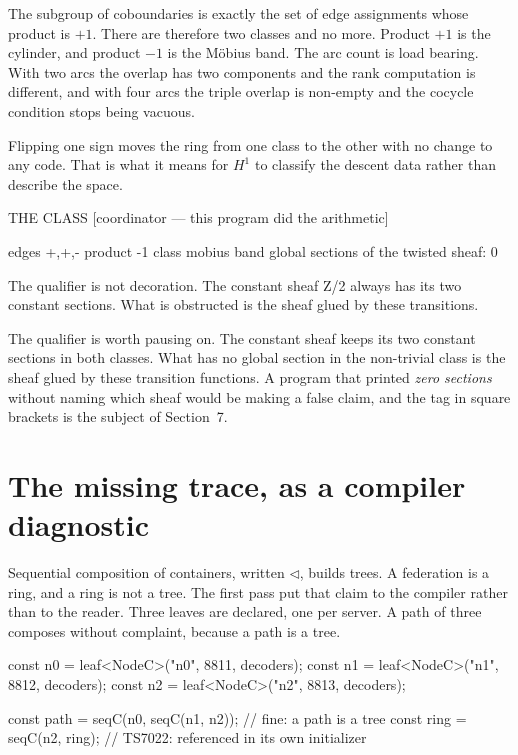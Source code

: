 \documentclass[11pt,a4paper]{article}
\begin{document}
The subgroup of coboundaries is exactly the set of edge assignments whose product is
$+1$. There are therefore two classes and no more. Product $+1$ is the cylinder, and
product $-1$ is the M\"obius band. The arc count is load bearing. With two arcs the
overlap has two components and the rank computation is different, and with four arcs
the triple overlap is non-empty and the cocycle condition stops being vacuous.

Flipping one sign moves the ring from one class to the other with no change to any
code. That is what it means for $H^1$ to classify the descent data rather than
describe the space.

\begin{term}
  THE CLASS   [coordinator — this program did the arithmetic]

    edges          +,+,-
    product        -1
    class          mobius band
    global sections of the twisted sheaf: 0

    The qualifier is not decoration. The constant sheaf Z/2 always has
    its two constant sections. What is obstructed is the sheaf glued by
    these transitions.
\end{term}

The qualifier is worth pausing on. The constant sheaf keeps its two constant sections
in both classes. What has no global section in the non-trivial class is the sheaf
glued by these transition functions. A program that printed \emph{zero sections} without
naming which sheaf would be making a false claim, and the tag in square brackets is
the subject of Section~7.

\section{The missing trace, as a compiler diagnostic}

Sequential composition of containers, written $\triangleleft$, builds trees. A
federation is a ring, and a ring is not a tree. The first pass put that claim to the
compiler rather than to the reader. Three leaves are declared, one per server. A path
of three composes without complaint, because a path is a tree.

\begin{code}
const n0 = leaf<NodeC>("n0", 8811, decoders);
const n1 = leaf<NodeC>("n1", 8812, decoders);
const n2 = leaf<NodeC>("n2", 8813, decoders);

const path = seqC(n0, seqC(n1, n2));   // fine: a path is a tree
const ring = seqC(n2, ring);           // TS7022: referenced in its own initializer
\end{code}
\end{document}

